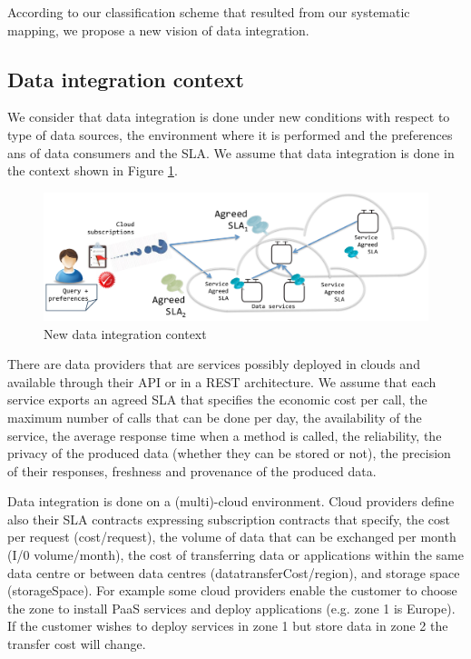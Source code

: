 
According to our classification scheme that resulted from our systematic mapping, we propose a new vision of data integration. 

\subsection{Data integration context}
We consider that data integration is done under new conditions with respect to type of data sources, the environment where it is performed and the preferences ans of data consumers and the SLA. We assume that data integration is done in the  context shown in Figure \ref{fig:vision}. 
\begin{figure}[h!]
\centering
\includegraphics[scale=0.50]{figs/DataIntegrationContext.pdf} 
\caption{New data integration context}\label{fig:vision}
\end{figure}

There are data providers that are services possibly deployed in clouds and available  through their API or in a REST architecture. We assume that  each service exports an agreed SLA that specifies the economic cost per call, the maximum number of calls that can be done per day, the availability of the service, the average response time when a method is called, the reliability, the privacy of the produced data (whether they can be stored or not), the precision of their responses, freshness and provenance of the produced data.  


Data integration is done on a (multi)-cloud environment. Cloud providers define also their SLA contracts expressing  subscription contracts that specify, the cost per request ({\sf cost/request}), the volume of data that can be exchanged per month ({\sf I/0 volume/month}), the cost of transferring data or applications within the same data centre or between data centres ({\sf datatransferCost/region}), and storage space ({\sf storageSpace}). For example some cloud providers enable the customer to choose the zone to install PaaS services and deploy applications (e.g. zone 1 is Europe). If the customer wishes to deploy services in zone 1 but store data in zone 2 the transfer cost will change.

